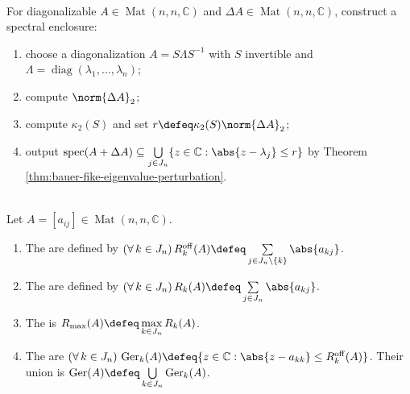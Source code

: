 \begin{computationmethod} \label{meth:bauer-fike-perturbation-method} \\
For diagonalizable $A\in\operatorname{Mat}(n,n,\mathbb{C})$ and $\Delta A\in\operatorname{Mat}(n,n,\mathbb{C})$, construct a spectral enclosure:
\begin{enumerate}[label=(\roman*)]
\setlength{\itemsep}{0pt}
\item choose a diagonalization $A=S\Lambda S^{-1}$ with $S$ invertible and $\Lambda=\operatorname{diag}(\lambda_1,\ldots,\lambda_n)$;
\item compute $\norm{\Delta A}_2$;
\item compute $\kappa_2(S)$ and set $r\defeq\kappa_2(S)\norm{\Delta A}_2$;
\item output $\operatorname{spec}(A+\Delta A)\subseteq\bigcup\limits_{j\in J_n}\{z\in\mathbb{C}:\abs{z-\lambda_j}\leq r\}$ by Theorem \ref{thm:bauer-fike-eigenvalue-perturbation}.
\end{enumerate}
\end{computationmethod}

\begin{definition} \label{def:gersgorin-disks} \\
Let $A=[a_{ij}]\in\operatorname{Mat}(n,n,\mathbb{C})$.
\begin{enumerate}[label=(\roman*)]
\setlength{\itemsep}{0pt}
\item The  are defined by $(\forall\,k\in J_n)\,R_k^{\mathrm{off}}(A)\defeq\sum\limits_{j\in J_n\setminus\{k\}}\abs{a_{kj}}$.
\item The  are defined by $(\forall\,k\in J_n)\,R_k(A)\defeq\sum\limits_{j\in J_n}\abs{a_{kj}}$.
\item The  is $R_{\max}(A)\defeq\max\limits_{k\in J_n}R_k(A)$.
\item The  are $(\forall\,k\in J_n)\,\operatorname{Ger}_k(A)\defeq\{z\in\mathbb{C}:\abs{z-a_{kk}}\leq R_k^{\mathrm{off}}(A)\}$. Their union is $\operatorname{Ger}(A)\defeq\bigcup\limits_{k\in J_n}\operatorname{Ger}_k(A)$.
\end{enumerate}
\end{definition}

